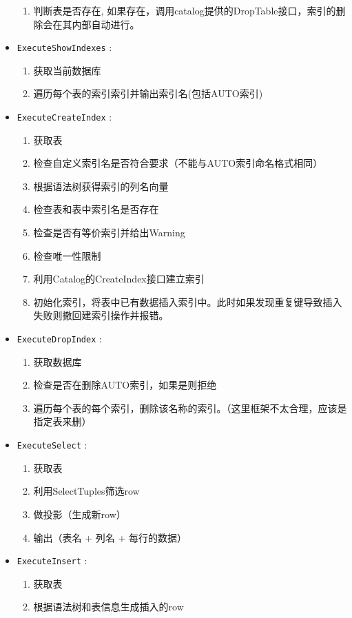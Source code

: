 \documentclass[12pt, a4paper]{article}
\def\c#1{\texttt{#1}}
\begin{document}
\begin{itemize}
\begin{enumerate}
    \item 判断表是否存在, 如果存在，调用catalog提供的DropTable接口，索引的删除会在其内部自动进行。
  \end{enumerate}
  \item  \c{ExecuteShowIndexes} : \begin{enumerate}
    \item 获取当前数据库
    \item 遍历每个表的索引索引并输出索引名(包括AUTO索引)
  \end{enumerate}
  \item  \c{ExecuteCreateIndex} : \begin{enumerate}
    \item 获取表
    \item 检查自定义索引名是否符合要求（不能与AUTO索引命名格式相同）
    \item 根据语法树获得索引的列名向量
    \item 检查表和表中索引名是否存在
    \item 检查是否有等价索引并给出Warning
    \item 检查唯一性限制
    \item 利用Catalog的CreateIndex接口建立索引
    \item 初始化索引，将表中已有数据插入索引中。此时如果发现重复键导致插入失败则撤回建索引操作并报错。
  \end{enumerate}
  \item  \c{ExecuteDropIndex} : \begin{enumerate}
    \item 获取数据库
    \item 检查是否在删除AUTO索引，如果是则拒绝
    \item 遍历每个表的每个索引，删除该名称的索引。（这里框架不太合理，应该是指定表来删）
  \end{enumerate}
  \item  \c{ExecuteSelect} : \begin{enumerate}
    \item 获取表
    \item 利用SelectTuples筛选row
    \item 做投影（生成新row）
    \item 输出（表名 + 列名 + 每行的数据）
  \end{enumerate}
  \item  \c{ExecuteInsert} : \begin{enumerate}
    \item 获取表
    \item 根据语法树和表信息生成插入的row

\end{enumerate}
\end{itemize}
\end{document}
